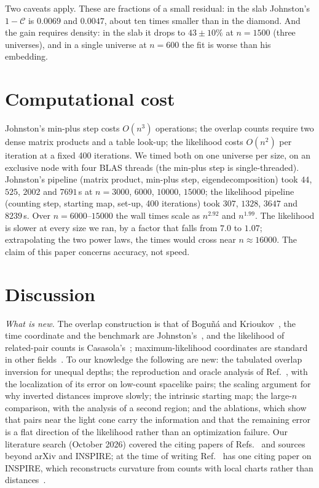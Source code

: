 \documentclass[prd,twocolumn,superscriptaddress,nofootinbib,amsmath,amssymb,floatfix]{revtex4-2}
\begin{document}
Two caveats apply. These are fractions of a small residual: in the slab Johnston's $1-\mathcal C$ is $0.0069$ and $0.0047$, about ten times smaller than in the diamond. And the gain requires density: in the slab it drops to $43\pm10\%$ at $n=1500$ (three universes), and in a single universe at $n=600$ the fit is worse than his embedding.

\section{Computational cost}\label{sec:cost}
Johnston's min-plus step costs $O(n^3)$ operations; the overlap counts require two dense matrix products and a table look-up; the likelihood costs $O(n^2)$ per iteration at a fixed 400 iterations. We timed both on one universe per size, on an exclusive node with four BLAS threads (the min-plus step is single-threaded). Johnston's pipeline (matrix product, min-plus step, eigendecomposition) took $44$, $525$, $2002$ and $7691$\,s at $n=3000$, $6000$, $10000$, $15000$; the likelihood pipeline (counting step, starting map, set-up, 400 iterations) took $307$, $1328$, $3647$ and $8239$\,s. Over $n=6000$--$15000$ the wall times scale as $n^{2.92}$ and $n^{1.99}$. The likelihood is slower at every size we ran, by a factor that falls from $7.0$ to $1.07$; extrapolating the two power laws, the times would cross near $n\approx16000$. The claim of this paper concerns accuracy, not speed.

\section{Discussion}\label{sec:disc}
\emph{What is new.} The overlap construction is that of Bogu\~n\'a and Krioukov~\cite{BK24}, the time coordinate and the benchmark are Johnston's~\cite{Johnston25}, and the likelihood of related-pair counts is Casasola's~\cite{Casasola26}; maximum-likelihood coordinates are standard in other fields~\cite{Ramsay77,Hoff02,BPK10,Mercator19,Sim21}. To our knowledge the following are new: the tabulated overlap inversion for unequal depths; the reproduction and oracle analysis of Ref.~\cite{Johnston25}, with the localization of its error on low-count spacelike pairs; the scaling argument for why inverted distances improve slowly; the intrinsic starting map; the large-$n$ comparison, with the analysis of a second region; and the ablations, which show that pairs near the light cone carry the information and that the remaining error is a flat direction of the likelihood rather than an optimization failure. Our literature search (October 2026) covered the citing papers of Refs.~\cite{BK24,Johnston25,CloughEvans16,Casasola26} and sources beyond arXiv and INSPIRE; at the time of writing Ref.~\cite{Johnston25} has one citing paper on INSPIRE, which reconstructs curvature from counts with local charts rather than distances~\cite{Madsen26}.
\end{document}
